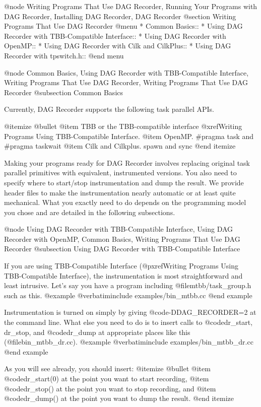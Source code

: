 @node Writing Programs That Use DAG Recorder, Running Your Programs with DAG Recorder, Installing DAG Recorder, DAG Recorder
@section Writing Programs That Use DAG Recorder
@menu
* Common Basics::
* Using DAG Recorder with TBB-Compatible Interface::
* Using DAG Recorder with OpenMP::
* Using DAG Recorder with Cilk and CilkPlus::
* Using DAG Recorder with tpswitch.h::
@end menu

@node Common Basics, Using DAG Recorder with TBB-Compatible Interface, Writing Programs That Use DAG Recorder, Writing Programs That Use DAG Recorder
@subsection Common Basics

Currently, DAG Recorder supports the following task parallel APIs.

@itemize @bullet
@item TBB or the TBB-compatible interface @xref{Writing Programs Using TBB-Compatible Interface}.
@item OpenMP. #pragma task and #pragma taskwait
@item Cilk and Cilkplus. spawn and sync
@end itemize

Making your programs ready for DAG Recorder involves replacing original
task parallel primitives with equivalent, instrumented versions.  You
also need to specify where to start/stop instrumentation and dump the
result.  We provide header files to make the instrumentation nearly
automatic or at least quite mechanical.  What you exactly need to do
depends on the programming model you chose and are detailed in the
following subsections.

@node Using DAG Recorder with TBB-Compatible Interface, Using DAG Recorder with OpenMP, Common Basics, Writing Programs That Use DAG Recorder
@subsection Using DAG Recorder with TBB-Compatible Interface

If you are using TBB-Compatible Interface (@pxref{Writing Programs Using TBB-Compatible Interface}), the instrumentation is most straightforward and least intrusive.  Let's say you have a program including @file{mtbb/task_group.h} such as this.
@example
@verbatiminclude examples/bin_mtbb.cc
@end example

Instrumentation is turned on simply by giving @code{-DDAG_RECORDER=2} at the command line.  What else you need to do is to insert calls to @code{dr_start, dr_stop,} and @code{dr_dump} at appropriate places like this  (@file{bin_mtbb_dr.cc}).
@example
@verbatiminclude examples/bin_mtbb_dr.cc
@end example

As you will see already, you should insert:
@itemize @bullet
@item @code{dr_start(0)} at the point you want to start recording,
@item @code{dr_stop()} at the point you want to stop recording, and
@item @code{dr_dump()} at the point you want to dump the result.
@end itemize

